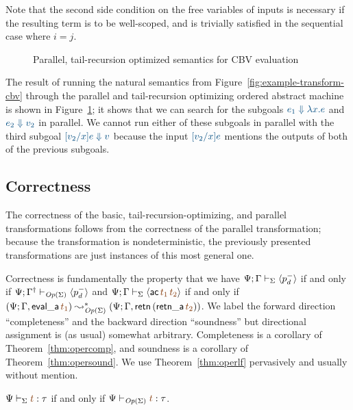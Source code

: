 \noindent
Note that the second side condition on the free variables of inputs is
necessary if the resulting term is to be well-scoped, and is trivially 
satisfied in the sequential case where $i = j$. 

\begin{figure}
\caption{Parallel, tail-recursion optimized semantics for
 CBV evaluation}
\label{fig:cbv-ev-ssos-par}
\end{figure}

The result of running the natural semantics from
Figure~\ref{fig:example-transform-cbv} through the parallel and
tail-recursion optimizing ordered abstract machine is shown in
Figure~\ref{fig:cbv-ev-ssos-par}; it shows that we can
search for the subgoals $\obj{e_1 \Downarrow \lambda x.e}$ and
$\obj{e_2 \Downarrow v_2}$ in parallel. We cannot run either
of these subgoals in parallel with the third subgoal 
$\obj{[v_2/x]e \Downarrow v}$ because the input 
$\obj{[v_2/x]e}$ mentions the outputs
of both of the previous subgoals. 

\subsection{Correctness}
\label{sec:operationalization-correct}

The correctness of the basic, tail-recursion-optimizing, and parallel
transformations follows from the correctness of the parallel
transformation; because the transformation is nondeterministic, the
previously presented transformations are just instances of this most
general one. 

Correctness is fundamentally the property that
we have ${\Psi}; {\Gamma} \vdash_{\Sigma} {\langle {p^-_d} \rangle}$ if and only if 
${\Psi}; {{{\Gamma}^\dag}} \vdash_{{\it Op}({\Sigma})} {\langle {p^-_d} \rangle}$
and $\slss{\Sigma}{\Psi}{\Gamma}{\susp{{\sf ac}\,\lf{t_1}\,\lf{t_2}}}$ if and only if
$(\Psi; \mkconj{\Gamma}{{\sf eval\_a}\,\lf{t_1}}) \leadsto^*_{\transop{\Sigma}} (\Psi; \mkconj{\Gamma}{{\sf retn}\,({\sf retn\_a}\,\lf{t_2})})$. We label the
forward direction ``completeness'' and the backward direction ``soundness''
but directional assignment is (as usual) somewhat arbitrary. 
Completeness is a corollary
of Theorem~\ref{thm:opercomp}, and soundness is a corollary of 
Theorem~\ref{thm:opersound}. We use Theorem~\ref{thm:operlf} pervasively
and usually without mention. 

\bigskip
\begin{theorem}\label{thm:operlf}
  $\Psi \vdash_\Sigma \lf{t} : \tau$ if and only if $\Psi
  \vdash_{\transop{\Sigma}} \lf{t} : \tau$.
\end{theorem}

